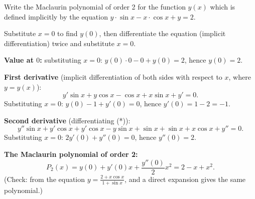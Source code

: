 
\begin{question}
Write the Maclaurin polynomial of order 2 for the function $y(x)$ which is defined implicitly by the equation $y\cdot\sin x-x\cdot\cos x+y=2$.
\end{question}

\begin{hint}
Substitute $x=0$ to find $y(0)$, then differentiate the equation (implicit differentiation) twice and substitute $x=0$.
\end{hint}

\begin{solution}
\textbf{Value at $0$:} substituting $x=0$: $y(0)\cdot0-0+y(0)=2$, hence $y(0)=2$.

\textbf{First derivative} (implicit differentiation of both sides with respect to $x$, where $y=y(x)$):
\[
y'\sin x+y\cos x-\cos x+x\sin x+y'=0.\tag{*}
\]
Substituting $x=0$: $y(0)-1+y'(0)=0$, hence $y'(0)=1-2=-1$.

\textbf{Second derivative} (differentiating (*)):
\[
y''\sin x+y'\cos x+y'\cos x-y\sin x+\sin x+\sin x+x\cos x+y''=0.
\]
Substituting $x=0$: $2y'(0)+y''(0)=0$, hence $y''(0)=2$.

\textbf{The Maclaurin polynomial of order 2:}
\[
P_2(x)=y(0)+y'(0)x+\frac{y''(0)}{2}x^2=2-x+x^2.
\]
(Check: from the equation $y=\frac{2+x\cos x}{1+\sin x}$, and a direct expansion gives the same polynomial.)
\end{solution}
